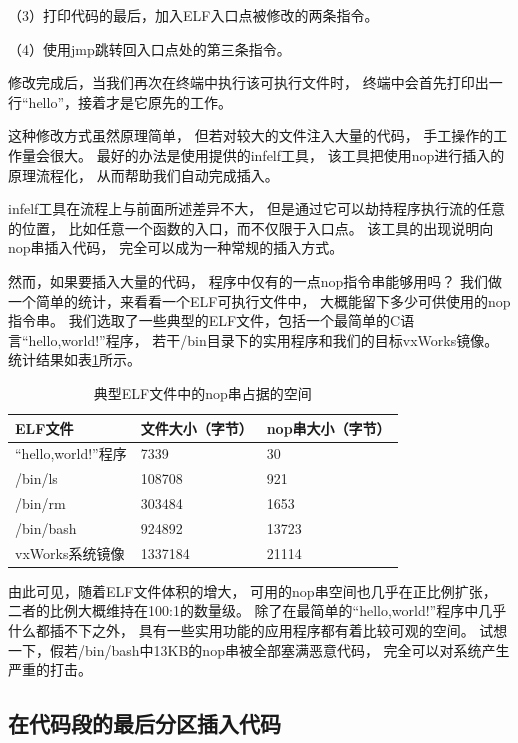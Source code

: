 （3）打印代码的最后，加入ELF入口点被修改的两条指令。

（4）使用jmp跳转回入口点处的第三条指令。

修改完成后，当我们再次在终端中执行该可执行文件时，
终端中会首先打印出一行“hello”，接着才是它原先的工作。

这种修改方式虽然原理简单，
但若对较大的文件注入大量的代码，
手工操作的工作量会很大。
最好的办法是使用\cite{infelf}提供的infelf工具，
该工具把使用nop进行插入的原理流程化，
从而帮助我们自动完成插入。

infelf工具在流程上与前面所述差异不大，
但是通过它可以劫持程序执行流的任意的位置，
比如任意一个函数的入口，而不仅限于入口点。
该工具的出现说明向nop串插入代码，
完全可以成为一种常规的插入方式。

然而，如果要插入大量的代码，
程序中仅有的一点nop指令串能够用吗？
我们做一个简单的统计，来看看一个ELF可执行文件中，
大概能留下多少可供使用的nop指令串。
我们选取了一些典型的ELF文件，包括一个最简单的C语言“hello,world!”程序，
若干/bin目录下的实用程序和我们的目标vxWorks镜像。
统计结果如表\ref{nopbytes}所示。

\begin{table}
  \centering
  \caption{典型ELF文件中的nop串占据的空间}
  \label{nopbytes}
  \begin{tabular}{l|l|l}
     \hline
     ELF文件       & 文件大小（字节）& nop串大小（字节） \\ \hline
 “hello,world!”程序  & 7339           & 30                 \\ \hline
     /bin/ls      & 108708          & 921                \\ \hline
     /bin/rm      & 303484         & 1653                \\ \hline  
     /bin/bash    & 924892        & 13723              \\ \hline
     vxWorks系统镜像 & 1337184        & 21114              \\ \hline
  \end{tabular}
\end{table}  

由此可见，随着ELF文件体积的增大，
可用的nop串空间也几乎在正比例扩张，
二者的比例大概维持在100:1的数量级。
除了在最简单的“hello,world!”程序中几乎什么都插不下之外，
具有一些实用功能的应用程序都有着比较可观的空间。
试想一下，假若/bin/bash中13KB的nop串被全部塞满恶意代码，
完全可以对系统产生严重的打击。

\subsection{在代码段的最后分区插入代码}

